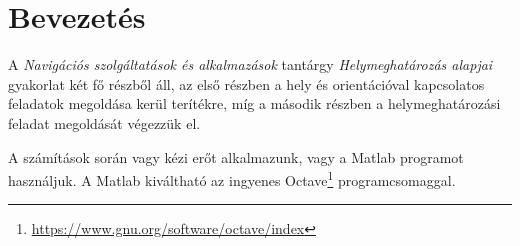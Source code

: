 \section{Bevezetés}
A \emph{Navigációs szolgáltatások és alkalmazások} tantárgy \emph{Helymeghatározás alapjai} gyakorlat két fő részből áll, az első részben a hely és orientációval kapcsolatos feladatok megoldása kerül terítékre, míg a második részben a helymeghatározási feladat megoldását végezzük el.

A számítások során vagy kézi erőt alkalmazunk, vagy a Matlab programot használjuk. A Matlab kiváltható az ingyenes Octave\footnote{\url{https://www.gnu.org/software/octave/index}} programcsomaggal.